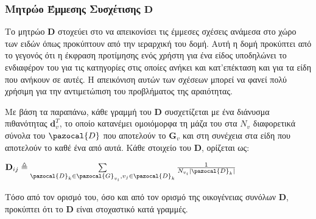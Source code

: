 \subsubsection{Μητρώο Έμμεσης Συσχέτισης $\mathbf{D}$}
Το μητρώο $\mathbf{D}$ στοχεύει στο να απεικονίσει τις έμμεσες σχέσεις ανάμεσα στο χώρο των ειδών όπως προκύπτουν από την ιεραρχική του δομή. Αυτή η δομή προκύπτει από το γεγονός ότι η έκφραση προτίμησης ενός χρήστη για ένα είδος υποδηλώνει το ενδιαφέρον του για τις κατηγορίες στις οποίες ανήκει και κατ'επέκταση και για τα είδη που ανήκουν σε αυτές. Η απεικόνιση αυτών των σχέσεων μπορεί να φανεί πολύ χρήσιμη για την αντιμετώπιση του προβλήματος της αραιότητας. \par
Με βάση τα παραπάνω, κάθε γραμμή του $\mathbf{D}$ συσχετίζεται με ένα διάνυσμα πιθανότητας $\mathbf{d}_v^T$, το οποίο κατανέμει ομοιόμορφα τη μάζα του στα $N_v$ διαφορετικά σύνολα του $\pazocal{D}$ που αποτελούν το $\mathbf{G}_v$ και στη συνέχεια στα είδη που αποτελούν το καθέ ένα από αυτά. Κάθε στοιχείο του $\mathbf{D}$, ορίζεται ως:
\begin{center}
$\mathbf{D}_{ij} \triangleq \sum\limits_{\pazocal{D}_k \in \pazocal{G}_{v_i}, v_j \in \pazocal{D}_k} \frac{1}{N_{v_i}|\pazocal{D}_k|}$
\end{center}
Τόσο από τον ορισμό του, όσο και από τον ορισμό της οικογένειας συνόλων $\mathbf{D}$, προκύπτει ότι το $\mathbf{D}$ είναι στοχαστικό κατά γραμμές. 
